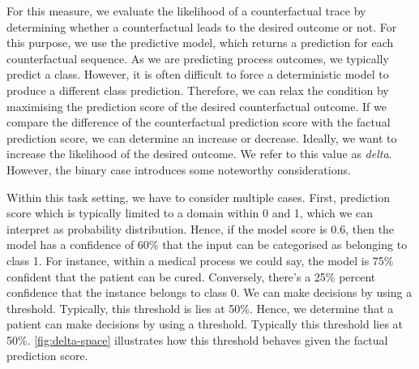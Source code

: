 \documentclass[./../../paper.tex]{subfiles}
\begin{document}
For this measure, we evaluate the likelihood of a counterfactual trace by determining whether a counterfactual leads to the desired outcome or not. For this purpose, we use the predictive model, which returns a prediction for each counterfactual sequence. As we are predicting process outcomes, we typically predict a class. However, it is often difficult to force a deterministic model to produce a different class prediction. Therefore, we can relax the condition by maximising the prediction score of the desired counterfactual outcome\autocite{molnar2019}. If we compare the difference of the counterfactual prediction score with the factual prediction score, we can determine an increase or decrease. Ideally, we want to increase the likelihood of the desired outcome. We refer to this value as \emph{delta}. However, the binary case introduces some noteworthy considerations. 

Within this task setting, we have to consider multiple cases. First, prediction score which is typically limited to a domain within 0 and 1, which we can interpret as probability distribution. Hence, if the model score is 0.6, then the model has a confidence of 60\% that the input can be categorised as belonging to class 1. For instance, within a medical process we could say, the model is 75\% confident that the patient can be cured. Conversely, there's a 25\% percent confidence that the \gls{instance} belongs to class 0. We can make decisions by using a threshold. Typically, this threshold is lies at 50\%. Hence, we determine that a patient can make decisions by using a threshold. Typically this threshold lies at 50\%. \autoref{fig:delta-space} illustrates how this threshold behaves given the factual prediction score. 
\end{document}
